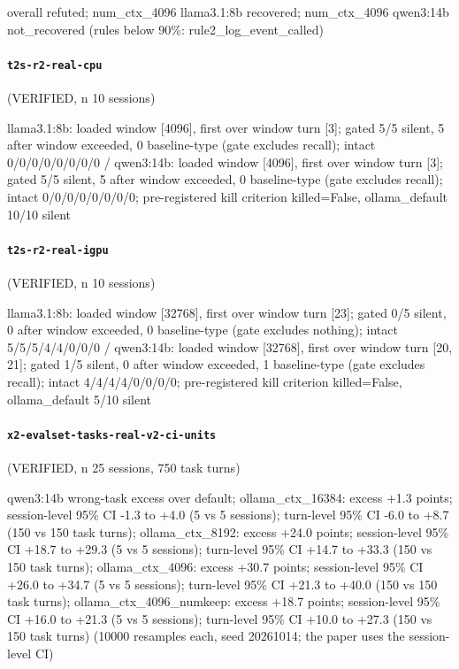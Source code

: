 {\footnotesize\raggedright overall refuted; num\_ctx\_4096 llama3.1:8b recovered; num\_ctx\_4096 qwen3:14b not\_recovered (rules below 90\%: rule2\_log\_event\_called)\par}

\paragraph{\texttt{t2s-r2-real-cpu}} (VERIFIED, n 10 sessions)

{\footnotesize\raggedright llama3.1:8b: loaded window [4096], first over window turn [3]; gated 5/5 silent, 5 after window exceeded, 0 baseline-type (gate excludes recall); intact 0/0/0/0/0/0/0/0 / qwen3:14b: loaded window [4096], first over window turn [3]; gated 5/5 silent, 5 after window exceeded, 0 baseline-type (gate excludes recall); intact 0/0/0/0/0/0/0/0; pre-registered kill criterion killed=False, ollama\_default 10/10 silent\par}

\paragraph{\texttt{t2s-r2-real-igpu}} (VERIFIED, n 10 sessions)

{\footnotesize\raggedright llama3.1:8b: loaded window [32768], first over window turn [23]; gated 0/5 silent, 0 after window exceeded, 0 baseline-type (gate excludes nothing); intact 5/5/5/4/4/0/0/0 / qwen3:14b: loaded window [32768], first over window turn [20, 21]; gated 1/5 silent, 0 after window exceeded, 1 baseline-type (gate excludes recall); intact 4/4/4/4/0/0/0/0; pre-registered kill criterion killed=False, ollama\_default 5/10 silent\par}

\paragraph{\texttt{x2-evalset-tasks-real-v2-ci-units}} (VERIFIED, n 25 sessions, 750 task turns)

{\footnotesize\raggedright qwen3:14b wrong-task excess over default; ollama\_ctx\_16384: excess +1.3 points; session-level 95\% CI -1.3 to +4.0 (5 vs 5 sessions); turn-level 95\% CI -6.0 to +8.7 (150 vs 150 task turns); ollama\_ctx\_8192: excess +24.0 points; session-level 95\% CI +18.7 to +29.3 (5 vs 5 sessions); turn-level 95\% CI +14.7 to +33.3 (150 vs 150 task turns); ollama\_ctx\_4096: excess +30.7 points; session-level 95\% CI +26.0 to +34.7 (5 vs 5 sessions); turn-level 95\% CI +21.3 to +40.0 (150 vs 150 task turns); ollama\_ctx\_4096\_numkeep: excess +18.7 points; session-level 95\% CI +16.0 to +21.3 (5 vs 5 sessions); turn-level 95\% CI +10.0 to +27.3 (150 vs 150 task turns) (10000 resamples each, seed 20261014; the paper uses the session-level CI)\par}

